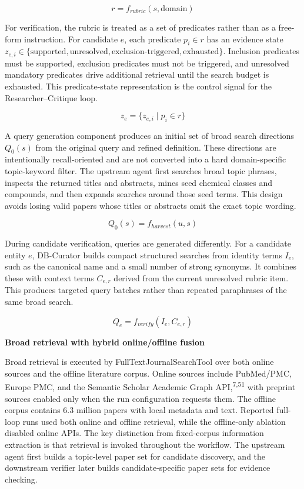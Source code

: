 \documentclass[
]{article}
\begin{document}
\[r = f_{rubric}(s, \text{domain})\]

For verification, the rubric is treated as a set of predicates rather
than as a free-form instruction. For candidate \(e\), each predicate
\(p_i \in r\) has an evidence state
\(z_{e,i} \in \{\text{supported}, \text{unresolved},
\text{exclusion-triggered}, \text{exhausted}\}\). Inclusion predicates
must be supported, exclusion predicates must not be triggered, and
unresolved mandatory predicates drive additional retrieval until the
search budget is exhausted. This predicate-state representation is the
control signal for the Researcher--Critique loop.

\[z_e = \{z_{e,i} \mid p_i \in r\}\]

A query generation component produces an initial set of broad search
directions \(Q_0(s)\) from the original query and refined definition.
These directions are intentionally recall-oriented and are not converted
into a hard domain-specific topic-keyword filter. The upstream agent first
searches broad topic phrases, inspects the returned titles and
abstracts, mines seed chemical classes and compounds, and then expands
searches around those seed terms. This design avoids losing valid papers
whose titles or abstracts omit the exact topic wording.

\[Q_0(s) = f_{harvest}(u,s)\]

During candidate verification, queries are generated differently. For a
candidate entity \(e\), DB-Curator builds compact structured searches
from identity terms \(I_e\), such as the canonical name and a small
number of strong synonyms. It combines these with context terms
\(C_{e,r}\) derived from the current unresolved rubric item. This
produces targeted query batches rather than repeated paraphrases of the
same broad search.

\[Q_e = f_{verify}(I_e,C_{e,r})\]

\textbf{Broad retrieval with hybrid online/offline fusion}

Broad retrieval is executed by FullTextJournalSearchTool over both
online sources and the offline literature corpus. Online sources include
PubMed/PMC, Europe PMC, and the Semantic Scholar Academic Graph API,\textsuperscript{7,51}
with preprint sources enabled only when the run configuration requests
them. The offline
corpus contains 6.3 million papers with local metadata and text.
Reported full-loop runs used both online and offline retrieval, while
the offline-only ablation disabled online APIs. The key distinction from
fixed-corpus information extraction is that retrieval is invoked
throughout the workflow. The upstream agent first builds a topic-level
paper set for candidate discovery, and the downstream verifier later
builds candidate-specific paper sets for evidence checking.
\end{document}
